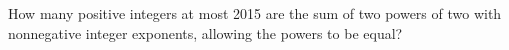 How many positive integers at most 2015 are the sum of two powers of two with nonnegative integer exponents, allowing the powers to be equal?
